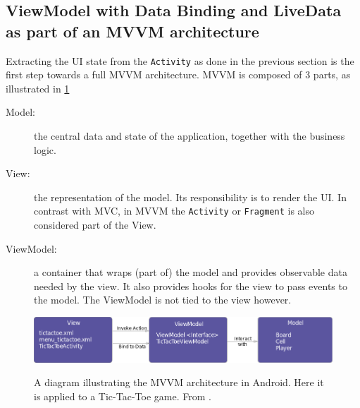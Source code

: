 



\subsection{ViewModel with Data Binding and LiveData as part of an MVVM architecture}

Extracting the UI state from the \lstinline!Activity! as done in the previous section is the first step towards a full MVVM architecture.
MVVM is composed of 3 parts, as illustrated in \ref{fig:MVVMdiagram}
\begin{description}
	\item[Model:] the central data and state of the application, together with the business logic.
	\item[View:] the representation of the model. Its responsibility is to render the UI.
				In contrast with MVC, in MVVM the  \lstinline!Activity! or  \lstinline!Fragment! is also considered part of the View.
	\item[ViewModel:] a container that wraps (part of) the model and provides observable data needed by the view.
	It also provides hooks for the view to pass events to the model. The ViewModel is not tied to the view however.
\end{description}

\begin{figure}[ht]
	\centering
	\includegraphics[width=\textwidth]{images/mvvm/MVVM.png}
	\label{fig:MVVMdiagram}
	\caption{A diagram illustrating the MVVM architecture in Android.
		Here it is applied to a Tic-Tac-Toe game.
		From \cite{mvc-mvp-mvv-on-android}.}
\end{figure}


